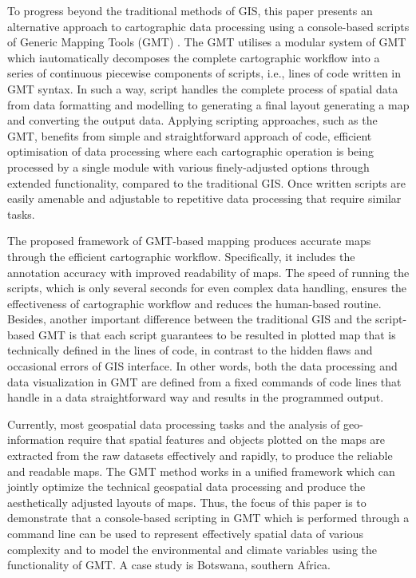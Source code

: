 \documentclass[ijgi,article,submit,pdftex,moreauthors]{Definitions/mdpi}
\begin{document}
To progress beyond the traditional methods of GIS, this paper presents an alternative approach to cartographic data processing using a console-based scripts of Generic Mapping Tools (GMT) \cite{Wessel}. The GMT utilises a modular system of GMT which iautomatically decomposes the complete cartographic workflow into a series of continuous piecewise components of scripts, i.e., lines of code written in GMT syntax. In such a way, script handles the complete process of spatial data from data formatting and modelling to generating a final layout generating a map and converting the output data. Applying scripting approaches, such as the GMT, benefits from simple and straightforward approach of code, efficient optimisation of data processing where each cartographic operation is being processed by a single module with various finely-adjusted options through extended functionality, compared to the traditional GIS. Once written scripts are easily amenable and adjustable to repetitive data processing that require similar tasks.

The proposed framework of GMT-based mapping produces accurate maps through the efficient cartographic workflow. Specifically, it includes the annotation accuracy with improved readability of maps. The speed of running the scripts, which is only several seconds for even complex data handling, ensures the effectiveness of cartographic workflow and reduces the human-based routine. Besides, another important difference between the traditional GIS and the script-based GMT is that each script guarantees to be resulted in plotted map that is technically defined in the lines of code, in contrast to the hidden flaws and occasional errors of GIS interface. In other words, both the data processing and data visualization in GMT are defined from a fixed commands of code lines that handle in a data straightforward way and results in the programmed output. 

Currently, most geospatial data processing tasks and the analysis of geo-information require that spatial features and objects plotted on the maps are extracted from the raw datasets effectively and rapidly, to produce the reliable and readable maps. The GMT method works in a unified framework which can jointly optimize the technical geospatial data processing and produce the aesthetically adjusted layouts of maps. Thus, the focus of this paper is to demonstrate that a console-based scripting in GMT which is performed through a command line can be used to represent effectively spatial data of various complexity and to model the environmental and climate variables using the functionality of GMT. A case study is Botswana, southern Africa.
\end{document}
